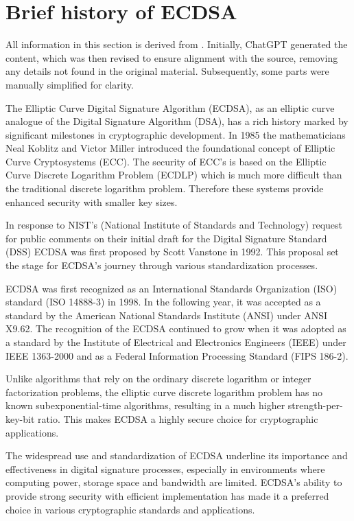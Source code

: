 \section{Brief history of ECDSA}

All information in this section is derived from \cite{Johnson2001}. Initially, ChatGPT generated the content, which was then revised to ensure alignment with the source, removing any details not found in the original material. Subsequently, some parts were manually simplified for clarity.

The Elliptic Curve Digital Signature Algorithm (ECDSA), as an elliptic curve analogue of the Digital Signature Algorithm (DSA), has a rich history marked by significant milestones in cryptographic development. In 1985 the mathematicians Neal Koblitz and Victor Miller introduced the foundational concept of Elliptic Curve Cryptosystems (ECC). The security of ECC's is based on the Elliptic Curve Discrete Logarithm Problem (ECDLP) which is much more difficult than the traditional discrete logarithm problem. Therefore these systems provide enhanced security with smaller key sizes.

In response to NIST’s (National Institute of Standards and Technology) request for public comments on their initial draft for the Digital Signature Standard (DSS) ECDSA was first proposed by Scott Vanstone in 1992. This proposal set the stage for ECDSA's journey through various standardization processes.

ECDSA was first recognized as an International Standards Organization (ISO) standard (ISO 14888-3) in 1998. In the following year, it was accepted as a standard by the American National Standards Institute (ANSI) under ANSI X9.62. The recognition of the ECDSA continued to grow when it was adopted as a standard by the Institute of Electrical and Electronics Engineers (IEEE) under IEEE 1363-2000 and as a Federal Information Processing Standard (FIPS 186-2).

Unlike algorithms that rely on the ordinary discrete logarithm or integer factorization problems, the elliptic curve discrete logarithm problem has no known subexponential-time algorithms, resulting in a much higher strength-per-key-bit ratio. This makes ECDSA a highly secure choice for cryptographic applications.

The widespread use and standardization of ECDSA underline its importance and effectiveness in digital signature processes, especially in environments where computing power, storage space and bandwidth are limited. ECDSA's ability to provide strong security with efficient implementation has made it a preferred choice in various cryptographic standards and applications.





